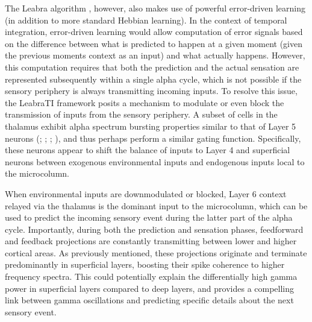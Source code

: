 \documentclass[dwyatte_dissertation.tex]{subfiles}
\begin{document}
The Leabra algorithm \cite{OReillyMunakata00,OReillyMunakataFrankEtAl12}, however, also makes use of powerful error-driven learning (in addition to more standard Hebbian learning). In the context of temporal integration, error-driven learning would allow computation of error signals based on the difference between what is predicted to happen at a given moment (given the previous moments context as an input) and what actually happens. However, this computation requires that both the prediction and the actual sensation are represented subsequently within a single alpha cycle, which is not possible if the sensory periphery is always transmitting incoming inputs. To resolve this issue, the LeabraTI framework posits a mechanism to modulate or even block the transmission of inputs from the sensory periphery. A subset of cells in the thalamus exhibit alpha spectrum bursting properties similar to that of Layer 5 neurons (; ; ; ), and thus perhaps perform a similar gating function. Specifically, these neurons appear to shift the balance of inputs to Layer 4 and superficial neurons between exogenous environmental inputs and endogenous inputs local to the microcolumn. %

When environmental inputs are downmodulated or blocked, Layer 6 context relayed via the thalamus is the dominant input to the microcolumn, which can be used to predict the incoming sensory event during the latter part of the alpha cycle. Importantly, during both the prediction and sensation phases, feedforward and feedback projections are constantly transmitting between lower and higher cortical areas. As previously mentioned, these projections originate and terminate predominantly in superficial layers, boosting their spike coherence to higher frequency spectra. This could potentially explain the differentially high gamma power in superficial layers compared to deep layers, and provides a compelling link between gamma oscillations and predicting specific details about the next sensory event.
\end{document}
